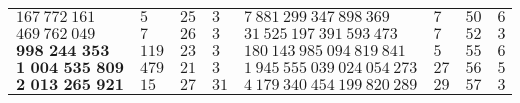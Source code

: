 \begin{tabular}{llll|llll}
    \(167~772~161\)            & \(5\)   & \(25\) & \(3\)  & \(7~881~299~347~898~369\)     & \(7\)  & \(50\) & \(6\)  \\
    \(469~762~049\)            & \(7\)   & \(26\) & \(3\)  & \(31~525~197~391~593~473\)    & \(7\)  & \(52\) & \(3\)  \\
    \(\textbf{998~244~353}\)   & \(119\) & \(23\) & \(3\)  & \(180~143~985~094~819~841\)   & \(5\)  & \(55\) & \(6\)  \\
    \(\textbf{1~004~535~809}\) & \(479\) & \(21\) & \(3\)  & \(1~945~555~039~024~054~273\) & \(27\) & \(56\) & \(5\)  \\
    \(\textbf{2~013~265~921}\) & \(15\)  & \(27\) & \(31\) & \(4~179~340~454~199~820~289\) & \(29\) & \(57\) & \(3\)  \\
    \hline
\end{tabular}
